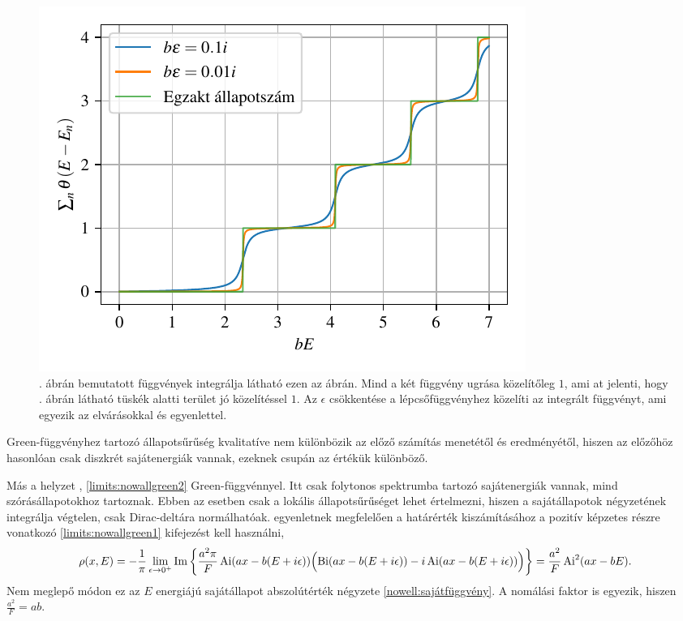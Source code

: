 \begin{figure}[H]
	\centering
	\includegraphics[scale=1]{./figs/numberofstatesfromgreen.pdf}
	\caption[Állapotok száma]{. ábrán bemutatott függvények integrálja látható ezen az ábrán. Mind a két függvény ugrása közelítőleg $1$, ami at jelenti, hogy . ábrán látható tüskék alatti terület jó közelítéssel $1$. Az $\epsilon$ csökkentése a lépcsőfüggvényhez közelíti az integrált függvényt, ami egyezik az elvárásokkal és  egyenlettel.}
\end{figure}
 Green-függvényhez tartozó állapotsűrűség kvalitatíve nem különbözik az előző számítás menetétől és eredményétől, hiszen az előzőhöz hasonlóan csak diszkrét sajátenergiák vannak, ezeknek csupán az értékük különböző.

Más a helyzet , \eqref{limits:nowallgreen2} Green-függvénnyel. Itt csak folytonos spektrumba tartozó sajátenergiák vannak, mind szórásállapotokhoz tartoznak. Ebben az esetben csak a lokális állapotsűrűséget lehet értelmezni, hiszen a sajátállapotok négyzetének integrálja végtelen, csak Dirac-deltára normálhatóak.  egyenletnek megfelelően a határérték kiszámításához a pozitív képzetes részre vonatkozó \eqref{limits:nowallgreen1} kifejezést kell használni,
\begin{dmath}
	\rho(x,E)=-\frac{1}{\pi}\lim_{\epsilon\to 0^+}\Im\left\lbrace\frac{a^2\pi}{F}\Ai(ax-b(E+i\epsilon))\Bigl(\Bi(ax-b(E+i\epsilon))-i\Ai(ax-b(E+i\epsilon))\Bigr)\right\rbrace=\frac{a^2}{F}\Ai^2(ax-bE).
\end{dmath}
Nem meglepő módon ez az $E$ energiájú sajátállapot abszolútérték négyzete \eqref{nowell:sajátfüggvény}. A nomálási faktor is egyezik, hiszen $\frac{a^2}{F}=ab$.




















